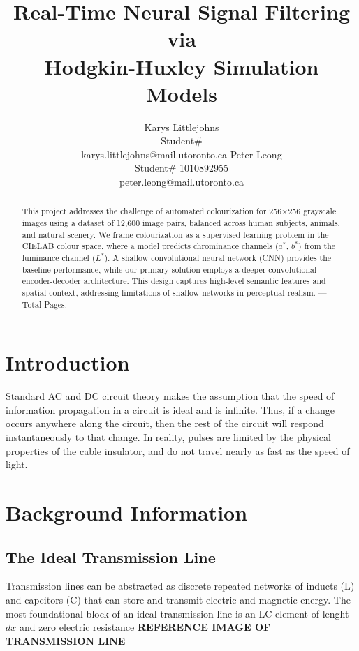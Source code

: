 \documentclass{article} %
\title{Real-Time Neural Signal Filtering via \\
Hodgkin-Huxley Simulation Models}
\author{Karys Littlejohns\\
Student\# \\
karys.littlejohns@mail.utoronto.ca
\And
Peter Leong \\
Student\# 1010892955 \\
peter.leong@mail.utoronto.ca \\
\AND
}
\begin{document}
\maketitle

\vspace{-6ex}

\begin{abstract}
This project addresses the challenge of automated colourization for 256$\times$256 grayscale images using a dataset of 12,600 image pairs, balanced across human subjects, 
animals, and natural scenery. We frame colourization as a supervised learning problem in the CIELAB colour space, where a model predicts chrominance channels ($a^*$, $b^*$) 
from the luminance channel ($L^*$). A shallow convolutional neural network (CNN) provides the baseline performance, while our primary solution employs a deeper convolutional 
encoder-decoder architecture. This design captures high-level semantic features and spatial context, addressing limitations of shallow networks in perceptual realism.
----Total Pages: \pageref{last_page}
\end{abstract}

\vspace{2ex}

\section{Introduction}

Standard AC and DC circuit theory makes the assumption that the speed of information propagation in a circuit is ideal and is infinite.
Thus, if a change occurs anywhere along the circuit, then the rest of the circuit will respond instantaneously to that change.
In reality, pulses are limited by the physical properties of the cable insulator, and do not travel nearly as fast as the speed of light.

\section{Background Information}



\subsection{The Ideal Transmission Line}

Transmission lines can be abstracted as discrete repeated networks of inducts (L) and capcitors (C) that can store and transmit electric and magnetic energy.
The most foundational block of an ideal transmission line is an LC element of lenght $dx$ and zero electric resistance \textbf{REFERENCE IMAGE OF TRANSMISSION LINE}
\end{document}

